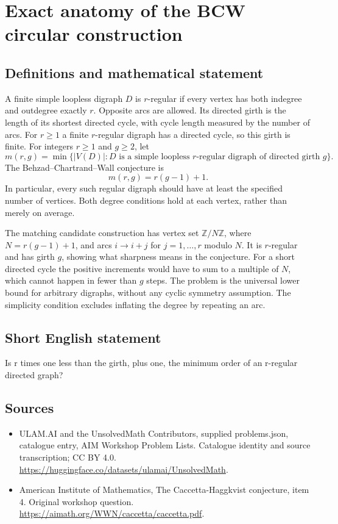 \documentclass[11pt,a4paper]{article}
\begin{document}
\section*{Exact anatomy of the BCW circular construction}\label{statement}

\subsection{Definitions and mathematical statement}
A finite simple loopless digraph $D$ is $r$-regular if every vertex has
both indegree and outdegree exactly $r$. Opposite arcs are allowed.
Its directed girth is the length of its shortest directed cycle, with
cycle length measured by the number of arcs. For $r\ge1$ a finite
$r$-regular digraph has a directed cycle, so this girth is finite.
For integers $r\ge1$ and $g\ge2$, let
\[
 m(r,g)=\min\{|V(D)|:D\text{ is a simple loopless }r\text{-regular
                         digraph of directed girth }g\}.
\]
The Behzad--Chartrand--Wall conjecture is
\[
                              m(r,g)=r(g-1)+1.
\]
In particular, every such regular digraph should have at least the
specified number of vertices. Both degree conditions hold at each
vertex, rather than merely on average.

The matching candidate construction has vertex set
$\mathbb Z/N\mathbb Z$, where $N=r(g-1)+1$, and arcs
$i\to i+j$ for $j=1,\ldots,r$ modulo $N$. It is $r$-regular and
has girth $g$, showing what sharpness means in the conjecture.
For a short directed cycle the positive increments would have to sum
to a multiple of $N$, which cannot happen in fewer than $g$ steps.
The problem is the universal lower bound for arbitrary digraphs,
without any cyclic symmetry assumption. The simplicity condition
excludes inflating the degree by repeating an arc.
\subsection{Short English statement}
Is r times one less than the girth, plus one, the minimum order of an r-regular directed graph?
\subsection{Sources}
\begin{itemize}
\item[S1] ULAM.AI and the UnsolvedMath Contributors, supplied problems.json, catalogue entry, AIM Workshop Problem Lists. Catalogue identity and source transcription; CC BY 4.0.
\url{https://huggingface.co/datasets/ulamai/UnsolvedMath}.
\item[S2] American Institute of Mathematics, The Caccetta-Haggkvist conjecture, item 4. Original workshop question.
\url{https://aimath.org/WWN/caccetta/caccetta.pdf}.
\end{itemize}
\end{document}

